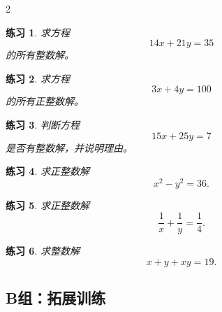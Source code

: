 \documentclass[11pt,a4paper,fontset=fandol]{ctexart}
\theoremstyle{formaltheorem}
\theoremstyle{formalexample}
\newtheorem{exercise}{练习}[section]
\newcommand{\smallblank}{\vspace{1.2cm}}
\begin{document}
\begin{multicols}{2}
\begin{exercise}
求方程
\[
14x+21y=35
\]
的所有整数解。
\end{exercise}
\smallblank

\begin{exercise}
求方程
\[
3x+4y=100
\]
的所有正整数解。
\end{exercise}
\smallblank

\begin{exercise}
判断方程
\[
15x+25y=7
\]
是否有整数解，并说明理由。
\end{exercise}
\smallblank

\begin{exercise}
求正整数解
\[
x^2-y^2=36.
\]
\end{exercise}
\smallblank

\begin{exercise}
求正整数解
\[
\frac1x+\frac1y=\frac14.
\]
\end{exercise}
\smallblank

\begin{exercise}
求整数解
\[
x+y+xy=19.
\]
\end{exercise}
\smallblank

\end{multicols}

\subsection{B组：拓展训练}
\end{document}

